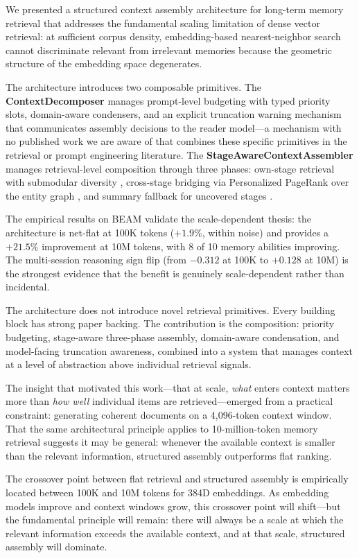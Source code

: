 \documentclass[11pt]{article}
\begin{document}
We presented a structured context assembly architecture for long-term
memory retrieval that addresses the fundamental scaling limitation of
dense vector retrieval: at sufficient corpus density, embedding-based
nearest-neighbor search cannot discriminate relevant from irrelevant
memories because the geometric structure of the embedding space
degenerates.

The architecture introduces two composable primitives.  The
\textbf{ContextDecomposer} manages prompt-level budgeting with typed
priority slots, domain-aware condensers, and an explicit truncation
warning mechanism that communicates assembly decisions to the reader
model---a mechanism with no published work we are aware of that combines these specific primitives in the retrieval or
prompt engineering literature.  The \textbf{StageAwareContextAssembler}
manages retrieval-level composition through three phases: own-stage
retrieval with submodular diversity \citep{Krause2008}, cross-stage
bridging via Personalized PageRank over the entity graph
\citep{Gutierrez2024}, and summary fallback for uncovered stages
\citep{Tse2007}.

The empirical results on BEAM validate the scale-dependent thesis:
the architecture is net-flat at 100K tokens ($+1.9\%$, within noise)
and provides a $+21.5\%$ improvement at 10M tokens, with 8 of 10
memory abilities improving.  The multi-session reasoning sign flip
(from $-0.312$ at 100K to $+0.128$ at 10M) is the strongest evidence
that the benefit is genuinely scale-dependent rather than incidental.

The architecture does not introduce novel retrieval primitives.
Every building block has strong paper backing.  The contribution is
the composition: priority budgeting, stage-aware three-phase assembly,
domain-aware condensation, and model-facing truncation awareness,
combined into a system that manages context at a level of abstraction
above individual retrieval signals.

The insight that motivated this work---that at scale, \emph{what}
enters context matters more than \emph{how well} individual items are
retrieved---emerged from a practical constraint: generating coherent
documents on a 4,096-token context window.  That the same
architectural principle applies to 10-million-token memory retrieval
suggests it may be general: whenever the available context is smaller
than the relevant information, structured assembly outperforms flat
ranking.

The crossover point between flat retrieval and structured assembly is
empirically located between 100K and 10M tokens for 384D embeddings.
As embedding models improve and context windows grow, this crossover
point will shift---but the fundamental principle will remain: there
will always be a scale at which the relevant information exceeds the
available context, and at that scale, structured assembly will
dominate.
\end{document}
